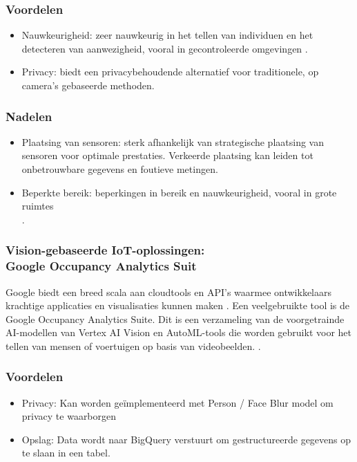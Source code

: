 {\subsubsection{Voordelen}
\begin{itemize}
    \item  Nauwkeurigheid: zeer nauwkeurig in het tellen van individuen en het detecteren van aanwezigheid, vooral in gecontroleerde omgevingen \autocite{Chaudhari2024, Khan2024}.
    \item Privacy: biedt een privacybehoudende alternatief voor traditionele, op camera's gebaseerde methoden. \autocite{Yang2018}
\end{itemize}}

\subsubsection{Nadelen}
\begin{itemize}
    \item  Plaatsing van sensoren: sterk afhankelijk van strategische plaatsing van sensoren voor optimale prestaties. Verkeerde plaatsing kan leiden tot onbetrouwbare gegevens en foutieve metingen. \autocite{Chaudhari2024, Begovic2024}
    \item  Beperkte bereik: beperkingen in bereik en nauwkeurigheid, vooral in grote ruimtes \\ \autocite{Chaudhari2024}. 
\end{itemize}

\subsubsection{Vision-gebaseerde IoT-oplossingen: \\ Google Occupancy Analytics Suit}
Google biedt een breed scala aan cloudtools en API’s waarmee ontwikkelaars krachtige applicaties en visualisaties kunnen maken \autocite{Dincer2013}. Een veelgebruikte tool is de Google Occupancy Analytics Suite. Dit is een verzameling van de voorgetrainde AI-modellen van Vertex AI Vision en AutoML-tools die worden gebruikt voor het tellen van mensen of voertuigen op basis van videobeelden. \autocite{Cloud2025, Cloud2025a}.

\subsubsection{Voordelen} \autocite{Cloud2025}
\begin{itemize}
    \item Privacy: Kan worden geïmplementeerd met Person / Face Blur model om privacy te waarborgen
    \item Opslag: Data wordt naar BigQuery verstuurt om gestructureerde gegevens op te slaan in een tabel.
\end{itemize}

